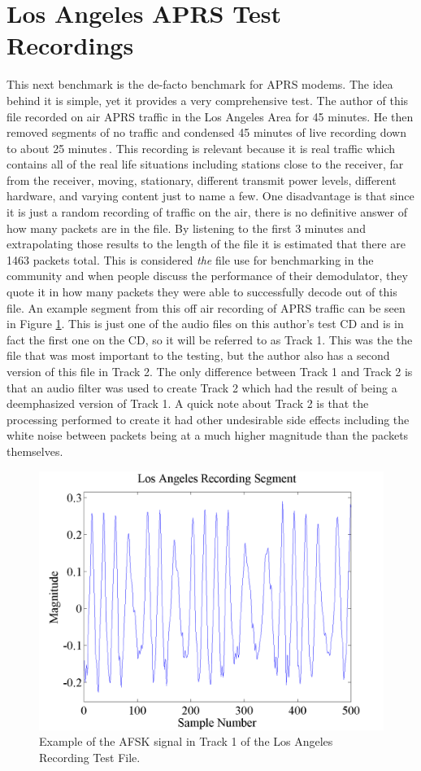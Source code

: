 \section{Los Angeles APRS Test Recordings}
This next benchmark is the de-facto benchmark for APRS modems. The idea behind it is simple, yet it provides a very comprehensive test. The author of this file recorded on air APRS traffic in the Los Angeles Area for 45 minutes. He then removed segments of no traffic and condensed 45 minutes of live recording down to about 25 minutes\,\cite{Smith2009}. This recording is relevant because it is real traffic which contains all of the real life situations including stations close to the receiver, far from the receiver, moving, stationary, different transmit power levels, different hardware, and varying content just to name a few. One disadvantage is that since it is just a random recording of traffic on the air, there is no definitive answer of how many packets are in the file. By listening to the first 3 minutes and extrapolating those results to the length of the file it is estimated that there are 1463 packets total. This is considered \textit{the} file use for benchmarking in the community and when people discuss the performance of their demodulator, they quote it in how many packets they were able to successfully decode out of this file. An example segment from this off air recording of APRS traffic can be seen in Figure \ref{Track1Segment}. This is just one of the audio files on this author's test CD and is in fact the first one on the CD, so it will be referred to as Track 1. This was the the file that was most important to the testing, but the author also has a second version of this file in Track 2. The only difference between Track 1 and Track 2 is that an audio filter was used to create Track 2 which had the result of being a deemphasized version of Track 1. A quick note about Track 2 is that the processing performed to create it had other undesirable side effects including the white noise between packets being at a much higher magnitude than the packets themselves.
\begin{figure}
  \centering
	\includegraphics[width=0.75\linewidth]{images/LosAngelesRecordingSegment.png} 
	\caption{Example of the AFSK signal in Track 1 of the Los Angeles Recording Test File.}
   \label{Track1Segment}
\end{figure}
